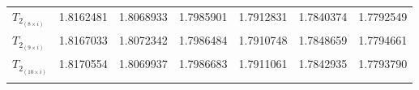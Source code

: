 \begin{table*}[t!]
\begin{tabular}{l*{6}{c}}
        $T_{2_{(8 \times i)}}$ & 1.8162481 & 1.8068933          & 1.7985901          & 1.7912831 & 1.7840374 & 1.7792549                  \\[+0.5ex]
        $T_{2_{(9 \times i)}}$ & 1.8167033 & 1.8072342          & 1.7986484          & 1.7910748 & 1.7848659 & 1.7794661                  \\[+0.5ex]
        $T_{2_{(10\times i)}}$ & 1.8170554 & 1.8069937          & 1.7986683          & 1.7911061 & 1.7842935 & 1.7793790                  \\[+0.5ex]
        \hline \\[-1.5ex]
    \end{tabular}
\end{table*}
